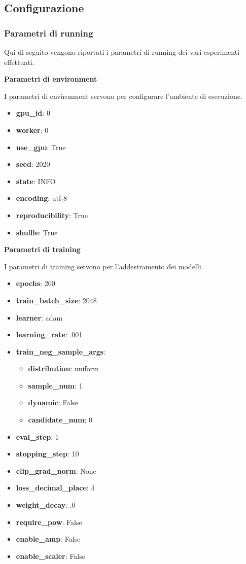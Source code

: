 \subsection{Configurazione}

\subsubsection{Parametri di running}
Qui di seguito vengono riportati i parametri di running dei vari esperimenti effettuati.


\noindent \textbf{Parametri di environment}


\noindent I parametri di environment servono per configurare l'ambiente di esecuzione.
\begin{itemize}
    \item \textbf{gpu\_id}: 0
    \item \textbf{worker}: 0
    \item \textbf{use\_gpu}: True
    \item \textbf{seed}: 2020
    \item \textbf{state}: INFO
    \item \textbf{encoding}: utf-8
    \item \textbf{reproducibility}: True
    \item \textbf{shuffle}: True
\end{itemize}


\noindent \textbf{Parametri di training}


\noindent I parametri di training servono per l'addestramento dei modelli.
\begin{itemize}
    \item \textbf{epochs}: 200
    \item \textbf{train\_batch\_size}: 2048
    \item \textbf{learner}: adam
    \item \textbf{learning\_rate}: .001
    \item \textbf{train\_neg\_sample\_args}: 
    \begin{itemize}
        \item \textbf{distribution}: uniform
        \item \textbf{sample\_num}: 1
        \item \textbf{dynamic}: False
        \item \textbf{candidate\_num}: 0
    \end{itemize}
    \item \textbf{eval\_step}: 1
    \item \textbf{stopping\_step}: 10
    \item \textbf{clip\_grad\_norm}: None
    \item \textbf{loss\_decimal\_place}: 4
    \item \textbf{weight\_decay}: .0
    \item \textbf{require\_pow}: False
    \item \textbf{enable\_amp}: False
    \item \textbf{enable\_scaler}: False
\end{itemize}


